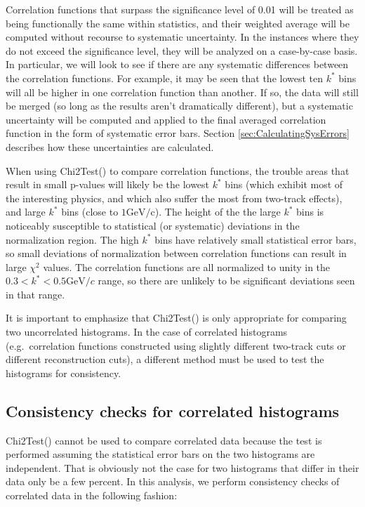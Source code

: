 Correlation functions that surpass the significance level of 0.01 will be treated as being functionally the same within statistics, and their weighted average will be computed without recourse to systematic uncertainty. 
In the instances where they do not exceed the significance level, they will be analyzed on a case-by-case basis.  
In particular, we will look to see if there are any systematic differences between the correlation functions.  
For example, it may be seen that the lowest ten $k^*$ bins will all be higher in one correlation function than another.  
If so, the data will still be merged (so long as the results aren't dramatically different), but a systematic uncertainty will be computed and applied to the final averaged correlation function in the form of systematic error bars.  
Section \ref{sec:CalculatingSysErrors} describes how these uncertainties are calculated.  

When using Chi2Test() to compare correlation functions, the trouble areas that result in small p-values will likely be the lowest $k^*$ bins (which exhibit most of the interesting physics, and which also suffer the most from two-track effects), and large $k^*$ bins (close to $1 \mathrm{GeV/c}$).  
The height of the the large $k^*$ bins is noticeably susceptible to statistical (or systematic) deviations in the normalization region.  
The high $k^*$ bins have relatively small statistical error bars, so small deviations of normalization between correlation functions can result in large $\chi^2$ values.  
The correlation functions are all normalized to unity in the $0.3 < k^* < 0.5 \mathrm{GeV}/c$ range, so there are unlikely to be significant deviations seen in that range.  

It is important to emphasize that Chi2Test() is only appropriate for comparing two uncorrelated histograms.  
In the case of correlated histograms (e.g.\ correlation functions constructed using slightly different two-track cuts or different reconstruction cuts), a different method must be used to test the histograms for consistency.  


\subsection{Consistency checks for correlated histograms}
\label{sec:ConsistencyCheckCorrelated}
Chi2Test() cannot be used to compare correlated data because the test is performed assuming the statistical error bars on the two histograms are independent.  
That is obviously not the case for two histograms that differ in their data only be a few percent.  
In this analysis, we perform consistency checks of correlated data in the following fashion:

